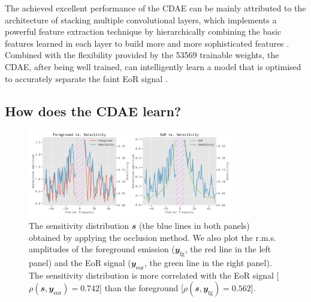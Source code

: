 \documentclass[fleqn,usenatbib]{mnras}
\newcommand{\R}[1]{\mathrm{#1}}
\newcommand{\B}[1]{\mathbfit{#1}}
\newcommand{\editwip}[1]{{\leavevmode\color{magenta}#1}}
\begin{document}
The achieved excellent performance of the CDAE can be mainly attributed
to the architecture of stacking multiple convolutional layers, which
implements a powerful feature extraction technique by hierarchically
combining the basic features learned in each layer to build more and
more sophisticated features \citep{lecun2015}.
Combined with the flexibility provided by the \num{53569} trainable
weights, the CDAE, after being well trained, can intelligently learn a
model that is optimised to accurately separate the faint EoR signal
\citep[e.g.,][]{domingos2012}.


\editwip{%
\subsection{How does the CDAE learn?}
\label{sec:explanation}

\begin{figure}
  \centering
  \includegraphics[width=0.8\textwidth]{occlusion-fgeor}
  \caption{\label{fig:occ-fgeor}\editwip{%
    The sensitivity distribution $\B{s}$ (the blue lines in both panels)
    obtained by applying the occlusion method.
    We also plot the r.m.s\@. amplitudes of the foreground emission
    ($\B{y}_{\R{fg}}$, the red line in the left panel) and the EoR signal
    ($\B{y}_{\R{eor}}$, the green line in the right panel).
    The sensitivity distribution is more correlated with the EoR signal
    [$\rho(\B{s}, \B{y}_{\R{eor}}) = 0.742$] than the foreground
    [$\rho(\B{s}, \B{y}_{\R{fg}}) = 0.562$].
  }}
\end{figure}

}
\end{document}
